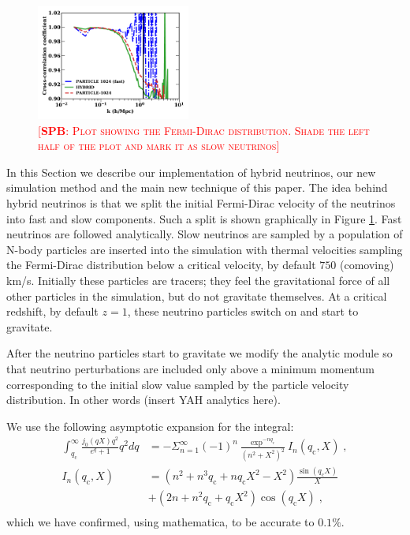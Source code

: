 \documentclass[useAMS, usenatbib]{mnras}
\newcommand{\spb}[1]{{\textsc{\textcolor{red}{[{\bf SPB}: #1]}}}}
\begin{document}
\begin{figure}
\includegraphics[width=0.45\textwidth]{nuplots/corr_coeff-1.pdf}
  \caption{\spb{Plot showing the Fermi-Dirac distribution. Shade the left half of the plot and mark it as slow neutrinos}
  }
  \label{fig:fddistribution}
\end{figure}

In this Section we describe our implementation of hybrid neutrinos, our new simulation method and the main new technique of this paper. The idea behind hybrid neutrinos is that we split the initial Fermi-Dirac velocity of the neutrinos into fast and slow components. Such a split is shown graphically in Figure \ref{fig:fddistribution}. Fast neutrinos are followed analytically. Slow neutrinos are sampled by a population of N-body particles are inserted into the simulation with thermal velocities sampling the Fermi-Dirac distribution below a critical velocity, by default $750$ (comoving) km/s. Initially these particles are tracers; they feel the gravitational force of all other particles in the simulation, but do not gravitate themselves. At a critical redshift, by default $z=1$, these neutrino particles switch on and start to gravitate.

After the neutrino particles start to gravitate we modify the
analytic module so that neutrino perturbations are included only above a
minimum momentum corresponding to the initial slow value sampled by the
particle velocity distribution. In other words (insert YAH analytics here).

We use the following asymptotic expansion for the integral:
\begin{align}
 \int^\infty_{q_\mathrm{c}} \frac{j_0(qX) q^2}{e^q + 1} q^2 dq &= - \Sigma^{\infty}_{n=1} (-1)^n \frac{\exp^{-n q_\mathrm{c}}}{(n^2+X^2)^2} I_n(q_\mathrm{c},X) \;,\\
 I_n(q_\mathrm{c},X) &= (n^2 + n^3 q_\mathrm{c} + n q_\mathrm{c} X^2 - X^2) \frac{\sin(q_\mathrm{c} X)}{X} \\
 &+ (2n + n^2 q_\mathrm{c} + q_\mathrm{c} X^2) \cos(q_\mathrm{c} X)\;,\\
\end{align}
which we have confirmed, using mathematica, to be accurate to $0.1\%$.
\end{document}
